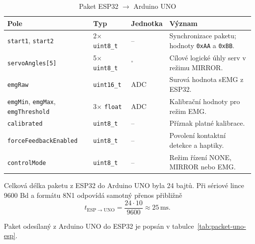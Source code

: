 \begin{table}[H]
\centering
\caption{Paket ESP32 $\rightarrow$ Arduino UNO}
\label{tab:packet-esp-uno}
\begin{tabular}{|p{}|p{}|p{}|p{}|}
\hline
\textbf{Pole} & \textbf{Typ} & \textbf{Jednotka} & \textbf{Význam} \\
\hline
\texttt{start1}, \texttt{start2} & 2$\times$ \texttt{uint8\_t} & -- & Synchronizace paketu; hodnoty \texttt{0xAA} a \texttt{0xBB}. \\
\hline
\texttt{servoAngles[5]} & 5$\times$ \texttt{uint8\_t} & $^\circ$ & Cílové logické úhly serv v režimu MIRROR\@. \\
\hline
\texttt{emgRaw} & \texttt{uint16\_t} & ADC & Surová hodnota sEMG z ESP32. \\
\hline
\texttt{emgMin}, \texttt{emgMax}, \texttt{emgThreshold} & 3$\times$ \texttt{float} & ADC & Kalibrační hodnoty pro režim EMG\@. \\
\hline
\texttt{calibrated} & \texttt{uint8\_t} & -- & Příznak platné kalibrace. \\
\hline
\texttt{forceFeedbackEnabled} & \texttt{uint8\_t} & -- & Povolení kontaktní detekce a haptiky. \\
\hline
\texttt{controlMode} & \texttt{uint8\_t} & -- & Režim řízení NONE, MIRROR nebo EMG\@. \\
\hline
\end{tabular}
\end{table}

Celková délka paketu z ESP32 do Arduino UNO byla 24 bajtů. Při sériové lince 9600 Bd a formátu 8N1 odpovídá samotný přenos přibližně
\begin{equation}
    t_{\mathrm{ESP}\rightarrow\mathrm{UNO}} =
    \frac{24 \cdot 10}{9600}
    \approx 25\,\mathrm{ms}.
\end{equation}

Paket odesílaný z Arduino UNO do ESP32 je popsán v tabulce~\ref{tab:packet-uno-esp}.

